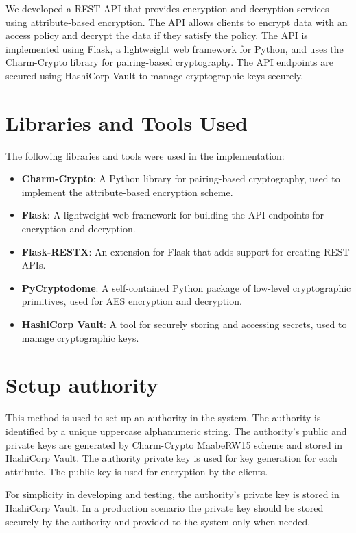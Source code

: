 We developed a REST API that provides encryption and decryption services using attribute-based encryption. The API allows clients to encrypt data with an access policy and decrypt the data if they satisfy the policy. The API is implemented using Flask, a lightweight web framework for Python, and uses the Charm-Crypto library for pairing-based cryptography. The API endpoints are secured using HashiCorp Vault to manage cryptographic keys securely.

\section{Libraries and Tools Used}

The following libraries and tools were used in the implementation:

\begin{itemize}
    \item \textbf{Charm-Crypto}: A Python library for pairing-based cryptography, used to implement the attribute-based encryption scheme.
    \item \textbf{Flask}: A lightweight web framework for building the API endpoints for encryption and decryption.
    \item \textbf{Flask-RESTX}: An extension for Flask that adds support for creating REST APIs.
    \item \textbf{PyCryptodome}: A self-contained Python package of low-level cryptographic primitives, used for AES encryption and decryption.
    \item \textbf{HashiCorp Vault}: A tool for securely storing and accessing secrets, used to manage cryptographic keys.
\end{itemize}


\section{Setup authority}
This method is used to set up an authority in the system. The authority is identified by a unique uppercase alphanumeric string. The authority's public and private keys are generated by Charm-Crypto MaabeRW15\cite{rouselakis2015efficient} scheme and stored in HashiCorp Vault. The authority private key is used for key generation for each attribute. The public key is used for encryption by the clients.

For simplicity in developing and testing, the authority's private key is stored in HashiCorp Vault. In a production scenario the private key should be stored securely by the authority and provided to the system only when needed.

